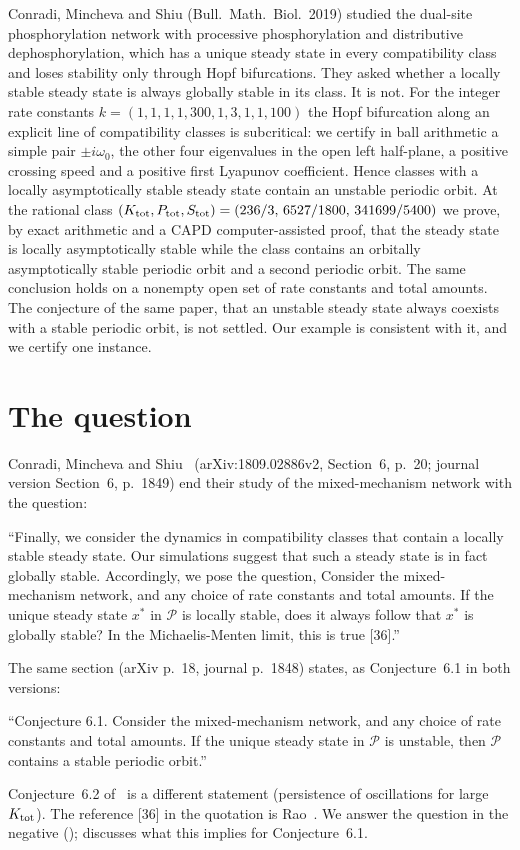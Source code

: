 \documentclass[11pt,a4paper]{report}
\begin{document}
\makepapertitle

\begin{paperabstract}
Conradi, Mincheva and Shiu (Bull.\ Math.\ Biol.\ 2019) studied the dual-site phosphorylation network with processive phosphorylation and distributive dephosphorylation, which has a unique steady state in every compatibility class and loses stability only through Hopf bifurcations. They asked whether a locally stable steady state is always globally stable in its class. It is not. For the integer rate constants $k=(1,1,1,1,300,1,3,1,1,100)$ the Hopf bifurcation along an explicit line of compatibility classes is subcritical: we certify in ball arithmetic a simple pair $\pm i\omega_0$, the other four eigenvalues in the open left half-plane, a positive crossing speed and a positive first Lyapunov coefficient. Hence classes with a locally asymptotically stable steady state contain an unstable periodic orbit. At the rational class $(K_{\rm tot},P_{\rm tot},S_{\rm tot})=(236/3,\,6527/1800,\,341699/5400)$ we prove, by exact arithmetic and a CAPD computer-assisted proof, that the steady state is locally asymptotically stable while the class contains an orbitally asymptotically stable periodic orbit and a second periodic orbit. The same conclusion holds on a nonempty open set of rate constants and total amounts. The conjecture of the same paper, that an unstable steady state always coexists with a stable periodic orbit, is not settled. Our example is consistent with it, and we certify one instance.
\end{paperabstract}

\section*{The question}
Conradi, Mincheva and Shiu~\autocite{CMS2019} (arXiv:1809.02886v2, Section~6, p.~20; journal version Section~6, p.~1849) end their study of the mixed-mechanism network with the question:
\begin{openquote}
``Finally, we consider the dynamics in compatibility classes that contain a locally stable steady state. Our simulations suggest that such a steady state is in fact globally stable. Accordingly, we pose the question, Consider the mixed-mechanism network, and any choice of rate constants and total amounts. If the unique steady state $x^*$ in $\mathcal P$ is locally stable, does it always follow that $x^*$ is globally stable? In the Michaelis-Menten limit, this is true [36].''
\end{openquote}
The same section (arXiv p.~18, journal p.~1848) states, as Conjecture~6.1 in both versions:
\begin{openquote}
``Conjecture 6.1. Consider the mixed-mechanism network, and any choice of rate constants and total amounts. If the unique steady state in $\mathcal P$ is unstable, then $\mathcal P$ contains a stable periodic orbit.''
\end{openquote}
Conjecture~6.2 of~\autocite{CMS2019} is a different statement (persistence of oscillations for large $K_{\rm tot}$). The reference [36] in the quotation is Rao~\autocite{Rao2018}. We answer the question in the negative ();  discusses what this implies for Conjecture~6.1.
\end{document}
